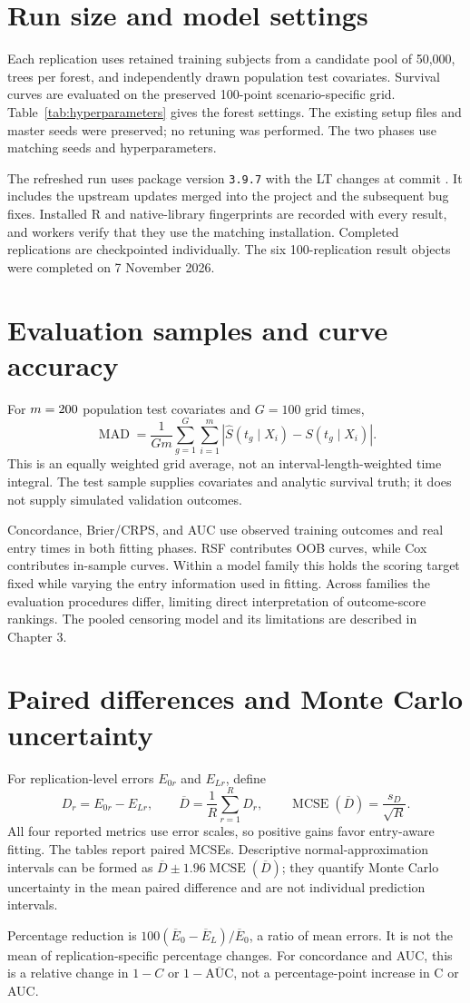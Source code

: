 \section{Run size and model settings}
Each replication uses \SimTrainN{} retained training subjects from a
candidate pool of 50,000, \SimTrees{} trees per forest, and
\SimTestN{} independently drawn population test covariates. Survival curves
are evaluated on the preserved 100-point scenario-specific grid.
Table~\ref{tab:hyperparameters} gives the forest settings. The existing
setup files and master seeds were preserved; no retuning was performed.
The two phases use matching seeds and hyperparameters.



The refreshed run uses package version \texttt{3.9.7} with the LT changes
at commit \RunCommit{}. It includes the upstream updates merged into the
project and the subsequent bug fixes. Installed R and native-library
fingerprints are recorded with every result, and workers verify that they
use the matching installation. Completed replications are checkpointed
individually. The six 100-replication result objects were completed on
7 November 2026.

\section{Evaluation samples and curve accuracy}
For $m=200$ population test covariates and $G=100$ grid times,
\[
 \operatorname{MAD}=\frac{1}{Gm}\sum_{g=1}^{G}\sum_{i=1}^{m}
 \left|\widehat S(t_g\mid X_i)-S(t_g\mid X_i)\right|.
\]
This is an equally weighted grid average, not an interval-length-weighted
time integral. The test sample supplies covariates and analytic survival
truth; it does not supply simulated validation outcomes.

Concordance, Brier/CRPS, and AUC use observed training outcomes and real
entry times in both fitting phases. RSF contributes OOB curves, while Cox
contributes in-sample curves. Within a model family this holds the scoring
target fixed while varying the entry information used in fitting.
Across families the evaluation procedures differ, limiting direct
interpretation of outcome-score rankings. The pooled censoring model and
its limitations are described in Chapter 3.

\section{Paired differences and Monte Carlo uncertainty}
For replication-level errors $E_{0r}$ and $E_{Lr}$, define
\[
 D_r=E_{0r}-E_{Lr},\qquad
 \overline D=\frac{1}{R}\sum_{r=1}^R D_r,\qquad
 \operatorname{MCSE}(\overline D)=\frac{s_D}{\sqrt R}.
\]
All four reported metrics use error scales, so positive gains favor
entry-aware fitting. The tables report paired MCSEs. Descriptive
normal-approximation intervals can be formed as
$\overline D\pm1.96\operatorname{MCSE}(\overline D)$; they quantify
Monte Carlo uncertainty in the mean paired difference and are not
individual prediction intervals.

Percentage reduction is
$100(\overline E_0-\overline E_L)/\overline E_0$, a ratio of mean errors.
It is not the mean of replication-specific percentage changes.
For concordance and AUC, this is a relative change in $1-C$ or
$1-\overline{\mathrm{AUC}}$, not a percentage-point increase in C or AUC.
